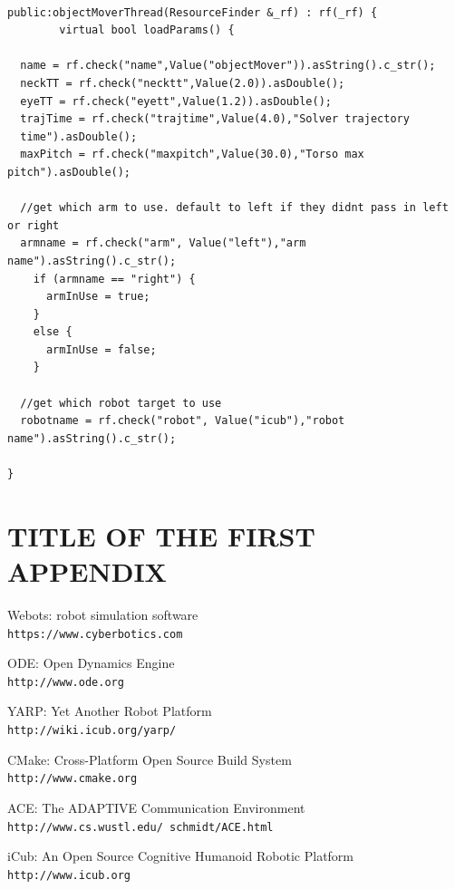 \documentclass[a4paper, 12pt]{report}
\begin{document}
\begin{lstlisting}

public:objectMoverThread(ResourceFinder &_rf) : rf(_rf) {
        virtual bool loadParams() {
  
  name = rf.check("name",Value("objectMover")).asString().c_str();
  neckTT = rf.check("necktt",Value(2.0)).asDouble();
  eyeTT = rf.check("eyett",Value(1.2)).asDouble();
  trajTime = rf.check("trajtime",Value(4.0),"Solver trajectory 
  time").asDouble();
  maxPitch = rf.check("maxpitch",Value(30.0),"Torso max pitch").asDouble();
  
  //get which arm to use. default to left if they didnt pass in left or right
  armname = rf.check("arm", Value("left"),"arm name").asString().c_str();
    if (armname == "right") {
      armInUse = true;
    }
    else {
      armInUse = false;
    }
  
  //get which robot target to use
  robotname = rf.check("robot", Value("icub"),"robot name").asString().c_str();
  
}
  \end{lstlisting}

\chapter{TITLE OF THE FIRST APPENDIX}

\appendix

\begin{thebibliography}{9}
Webots: robot simulation software
\\\texttt{https://www.cyberbotics.com}

ODE: Open Dynamics Engine
\\\texttt{http://www.ode.org}

YARP: Yet Another Robot Platform 
\\\texttt{http://wiki.icub.org/yarp/}

CMake: Cross-Platform Open Source Build System 
\\\texttt{http://www.cmake.org}

ACE: The ADAPTIVE Communication Environment
\\\texttt{http://www.cs.wustl.edu/~schmidt/ACE.html}

iCub: An Open Source Cognitive Humanoid Robotic Platform
\\\texttt{http://www.icub.org}

\end{thebibliography}
\end{document}
